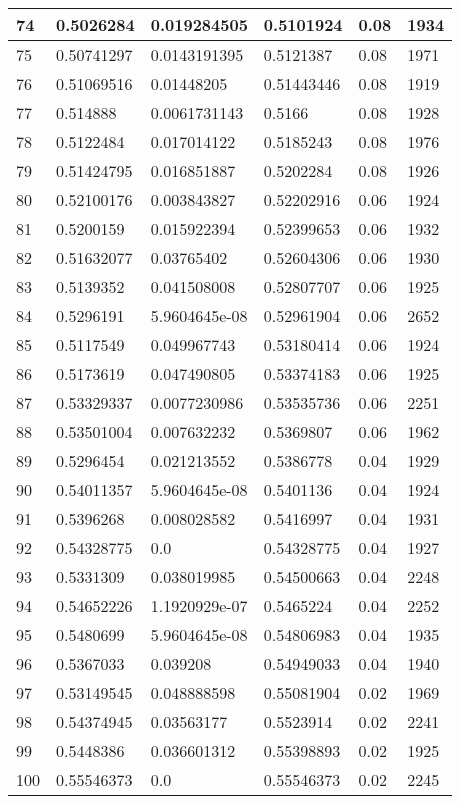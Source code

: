 \begin{longtable}{|l|l|l|l|l|l|}
74 & 0.5026284 & 0.019284505 & 0.5101924 & 0.08 & 1934 \\ \hline 
75 & 0.50741297 & 0.0143191395 & 0.5121387 & 0.08 & 1971 \\ \hline 
76 & 0.51069516 & 0.01448205 & 0.51443446 & 0.08 & 1919 \\ \hline 
77 & 0.514888 & 0.0061731143 & 0.5166 & 0.08 & 1928 \\ \hline 
78 & 0.5122484 & 0.017014122 & 0.5185243 & 0.08 & 1976 \\ \hline 
79 & 0.51424795 & 0.016851887 & 0.5202284 & 0.08 & 1926 \\ \hline 
80 & 0.52100176 & 0.003843827 & 0.52202916 & 0.06 & 1924 \\ \hline 
81 & 0.5200159 & 0.015922394 & 0.52399653 & 0.06 & 1932 \\ \hline 
82 & 0.51632077 & 0.03765402 & 0.52604306 & 0.06 & 1930 \\ \hline 
83 & 0.5139352 & 0.041508008 & 0.52807707 & 0.06 & 1925 \\ \hline 
84 & 0.5296191 & 5.9604645e-08 & 0.52961904 & 0.06 & 2652 \\ \hline 
85 & 0.5117549 & 0.049967743 & 0.53180414 & 0.06 & 1924 \\ \hline 
86 & 0.5173619 & 0.047490805 & 0.53374183 & 0.06 & 1925 \\ \hline 
87 & 0.53329337 & 0.0077230986 & 0.53535736 & 0.06 & 2251 \\ \hline 
88 & 0.53501004 & 0.007632232 & 0.5369807 & 0.06 & 1962 \\ \hline 
89 & 0.5296454 & 0.021213552 & 0.5386778 & 0.04 & 1929 \\ \hline 
90 & 0.54011357 & 5.9604645e-08 & 0.5401136 & 0.04 & 1924 \\ \hline 
91 & 0.5396268 & 0.008028582 & 0.5416997 & 0.04 & 1931 \\ \hline 
92 & 0.54328775 & 0.0 & 0.54328775 & 0.04 & 1927 \\ \hline 
93 & 0.5331309 & 0.038019985 & 0.54500663 & 0.04 & 2248 \\ \hline 
94 & 0.54652226 & 1.1920929e-07 & 0.5465224 & 0.04 & 2252 \\ \hline 
95 & 0.5480699 & 5.9604645e-08 & 0.54806983 & 0.04 & 1935 \\ \hline 
96 & 0.5367033 & 0.039208 & 0.54949033 & 0.04 & 1940 \\ \hline 
97 & 0.53149545 & 0.048888598 & 0.55081904 & 0.02 & 1969 \\ \hline 
98 & 0.54374945 & 0.03563177 & 0.5523914 & 0.02 & 2241 \\ \hline 
99 & 0.5448386 & 0.036601312 & 0.55398893 & 0.02 & 1925 \\ \hline 
100 & 0.55546373 & 0.0 & 0.55546373 & 0.02 & 2245 \\ \hline 
\end{longtable}